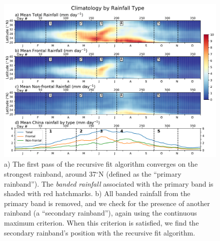 \documentclass[singlecolumn,11pt]{pnas-new}
\begin{document}
\begin{figure}[htbp]
\centering
\noindent\includegraphics[width=39pc]{Figures/hov_types_climo}
\caption{a) The first pass of the recursive fit algorithm converges on the strongest rainband, around 37$^{\circ}$N (defined as the ``primary rainband''). The \textit{banded rainfall} associated with the primary band is shaded with red hatchmarks. b) All banded rainfall from the primary band is removed, and we check for the presence of another rainband (a ``secondary rainband''), again using the continuous maximum criterion. When this criterion is satisfied, we find the secondary rainband's position with the recursive fit algorithm.}
\label{fig:type_hov}
\end{figure}
\end{document}
